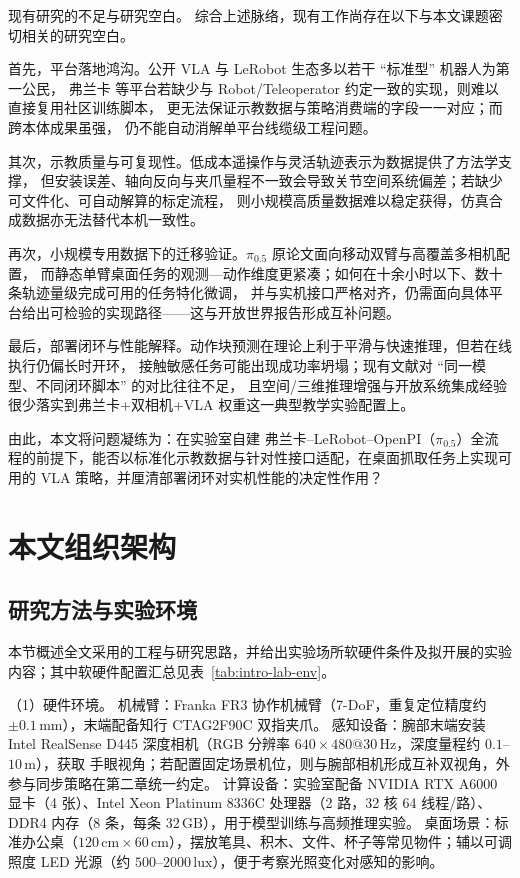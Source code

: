 现有研究的不足与研究空白。
综合上述脉络，现有工作尚存在以下与本文课题密切相关的研究空白。

首先，平台落地鸿沟。公开 VLA 与 LeRobot 生态多以若干 ``标准型'' 机器人为第一公民，
弗兰卡 等平台若缺少与 Robot/Teleoperator 约定一致的实现，则难以直接复用社区训练脚本，
更无法保证示教数据与策略消费端的字段一一对应；而跨本体成果\cite{oneill2024openxembodiment,kim2024openvla,ghosh2024octo}虽强，
仍不能自动消解单平台线缆级工程问题。

其次，示教质量与可复现性。低成本遥操作\cite{fu2024mobilealoha,zhao2024alohaunleashed}与灵活轨迹表示\cite{wen2023apt}为数据提供了方法学支撑，
但安装误差、轴向反向与夹爪量程不一致会导致关节空间系统偏差；若缺少可文件化、可自动解算的标定流程，
则小规模高质量数据难以稳定获得，仿真合成数据\cite{nasiriany2024robocasa,taole2024maniskill3}亦无法替代本机一致性。

再次，小规模专用数据下的迁移验证。$\pi_{0.5}$\cite{black2025pi05} 原论文面向移动双臂与高覆盖多相机配置，
而静态单臂桌面任务的观测—动作维度更紧凑；如何在十余小时以下、数十条轨迹量级完成可用的任务特化微调，
并与实机接口严格对齐，仍需面向具体平台给出可检验的实现路径——这与开放世界报告\cite{black2025pi05,physicalintelligence2025pi06}形成互补问题。

最后，部署闭环与性能解释。动作块预测\cite{pertsch2025fast}在理论上利于平滑与快速推理，但若在线执行仍偏长时开环，
接触敏感任务可能出现成功率坍塌；现有文献对 ``同一模型、不同闭环脚本'' 的对比往往不足，
且空间/三维推理增强\cite{chen2024spatialvlm,zhen20243dvla,ren2025surfer}与开放系统集成经验\cite{liu2024okrobot}很少落实到弗兰卡+双相机+VLA 权重这一典型教学实验配置上。

由此，本文将问题凝练为：在实验室自建 弗兰卡--LeRobot--OpenPI（$\pi_{0.5}$）全流程的前提下，能否以标准化示教数据与针对性接口适配，在桌面抓取任务上实现可用的 VLA 策略，并厘清部署闭环对实机性能的决定性作用？

\section{本文组织架构}

\subsection{研究方法与实验环境}

本节概述全文采用的工程与研究思路，并给出实验场所软硬件条件及拟开展的实验内容；其中软硬件配置汇总见表~\ref{tab:intro-lab-env}。

（1）硬件环境。
机械臂：Franka FR3 协作机械臂（7-DoF，重复定位精度约 $\pm 0.1\,\mathrm{mm}$），末端配备知行 CTAG2F90C 双指夹爪。
感知设备：腕部末端安装 Intel RealSense D445 深度相机（RGB 分辨率 $640\times480@30\,\mathrm{Hz}$，深度量程约 $0.1$--$10\,\mathrm{m}$），获取 手眼视角；若配置固定场景机位，则与腕部相机形成互补双视角，外参与同步策略在第二章统一约定。
计算设备：实验室配备 NVIDIA RTX A6000 显卡（4 张）、Intel Xeon Platinum 8336C 处理器（2 路，32 核 64 线程/路）、DDR4 内存（8 条，每条 $32\,\mathrm{GB}$），用于模型训练与高频推理实验。
桌面场景：标准办公桌（$120\,\mathrm{cm}\times 60\,\mathrm{cm}$），摆放笔具、积木、文件、杯子等常见物件；辅以可调照度 LED 光源（约 $500$--$2000\,\mathrm{lux}$），便于考察光照变化对感知的影响。

